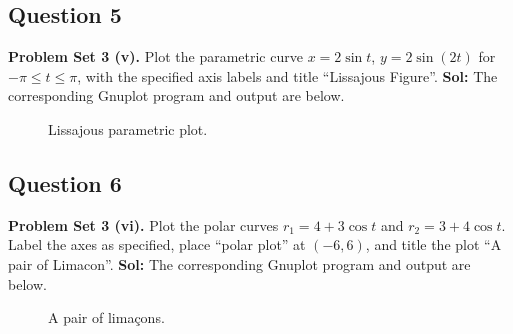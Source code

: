 \documentclass{book}
\begin{document}
\subsection*{Question 5}
\noindent\textbf{Problem Set 3 (v).} Plot the parametric curve $x=2\sin t$, $y=2\sin(2t)$ for $-\pi\leq t\leq\pi$, with the specified axis labels and title ``Lissajous Figure''.
\noindent\textbf{Sol:} The corresponding Gnuplot program and output are below.

\begin{figure}[htbp]
    \centering
    
    \caption{Lissajous parametric plot.}
\end{figure}

\newpage
\subsection*{Question 6}
\noindent\textbf{Problem Set 3 (vi).} Plot the polar curves $r_1=4+3\cos t$ and $r_2=3+4\cos t$. Label the axes as specified, place ``polar plot'' at $(-6,6)$, and title the plot ``A pair of Limacon''.
\noindent\textbf{Sol:} The corresponding Gnuplot program and output are below.

\begin{figure}[htbp]
    \centering
    
    \caption{A pair of limaçons.}
\end{figure}
\end{document}
